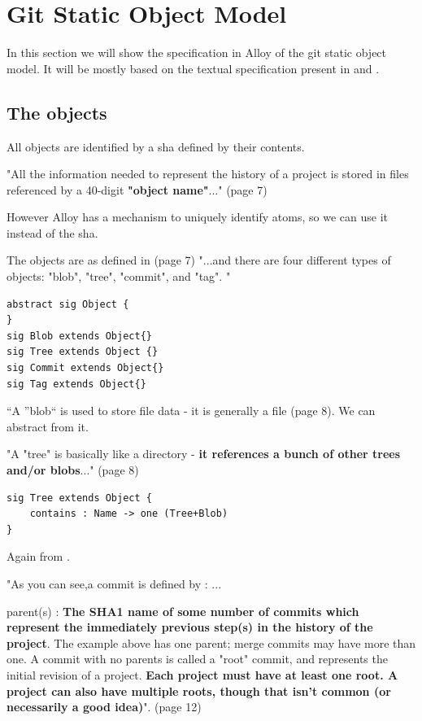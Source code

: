 \section{Git Static Object Model}

In this section we will show the specification in Alloy of the
git static object model. It will be mostly based on the textual
specification present in \cite{gitComm} and \cite{progit}.

\subsection{The objects}

All objects are identified by a sha defined by their contents. \par
"All the information needed to represent the history
of a project is stored in files referenced by a 
40-digit {\bf "object name"}..." (page 7) \par

However Alloy has a mechanism to uniquely identify atoms, so 
we can use it instead of the sha. \par

The objects are as defined in \cite{gitComm} (page 7) 
"...and there are four different types of objects: "blob",
"tree", "commit", and "tag". "

\begin{lstlisting}
abstract sig Object {
}
sig Blob extends Object{}
sig Tree extends Object {}
sig Commit extends Object{}
sig Tag extends Object{}
\end{lstlisting}

``A ''blob`` is used to store file data - it is generally a file 
\cite{gitComm} (page 8). We can abstract from it.

"A "tree" is basically like a directory - {\bf it references a bunch
of other trees and/or blobs}..." (page 8)

\begin{lstlisting}
sig Tree extends Object {
	contains : Name -> one (Tree+Blob)
}
\end{lstlisting}

Again from \cite{gitComm}. \par 
"As you can see,a commit is defined by :
... \par
parent(s) : {\bf The SHA1 name of some number of commits which
represent the immediately previous step(s) in the 
history of the project}. The example above has one parent;
merge commits may have more than one. A commit with no 
parents is called a "root" commit, and represents the 
initial revision of a project. {\bf Each project must have at
least one root. A project can also have multiple roots,
though that isn't common (or necessarily a good idea)}". (page 12)


